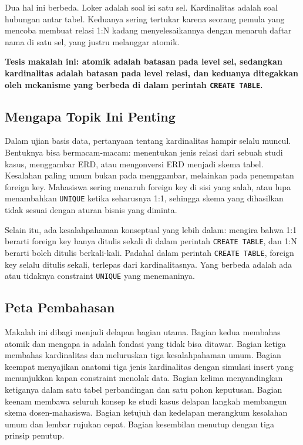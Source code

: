 \documentclass[11pt,a4paper]{article}
\begin{document}
Dua hal ini berbeda. Loker adalah soal isi satu sel. Kardinalitas adalah soal hubungan antar tabel. Keduanya sering tertukar karena seorang pemula yang mencoba membuat relasi 1:N kadang menyelesaikannya dengan menaruh daftar nama di satu sel, yang justru melanggar atomik.

\textbf{Tesis makalah ini: atomik adalah batasan pada level sel, sedangkan kardinalitas adalah batasan pada level relasi, dan keduanya ditegakkan oleh mekanisme yang berbeda di dalam perintah \texttt{CREATE TABLE}.}

\subsection{Mengapa Topik Ini Penting}

Dalam ujian basis data, pertanyaan tentang kardinalitas hampir selalu muncul. Bentuknya bisa bermacam-macam: menentukan jenis relasi dari sebuah studi kasus, menggambar ERD, atau mengonversi ERD menjadi skema tabel. Kesalahan paling umum bukan pada menggambar, melainkan pada penempatan foreign key. Mahasiswa sering menaruh foreign key di sisi yang salah, atau lupa menambahkan \texttt{UNIQUE} ketika seharusnya 1:1, sehingga skema yang dihasilkan tidak sesuai dengan aturan bisnis yang diminta.

Selain itu, ada kesalahpahaman konseptual yang lebih dalam: mengira bahwa 1:1 berarti foreign key hanya ditulis sekali di dalam perintah \texttt{CREATE TABLE}, dan 1:N berarti boleh ditulis berkali-kali. Padahal dalam perintah \texttt{CREATE TABLE}, foreign key selalu ditulis sekali, terlepas dari kardinalitasnya. Yang berbeda adalah ada atau tidaknya constraint \texttt{UNIQUE} yang menemaninya.

\subsection{Peta Pembahasan}

Makalah ini dibagi menjadi delapan bagian utama. Bagian kedua membahas atomik dan mengapa ia adalah fondasi yang tidak bisa ditawar. Bagian ketiga membahas kardinalitas dan meluruskan tiga kesalahpahaman umum. Bagian keempat menyajikan anatomi tiga jenis kardinalitas dengan simulasi insert yang menunjukkan kapan constraint menolak data. Bagian kelima menyandingkan ketiganya dalam satu tabel perbandingan dan satu pohon keputusan. Bagian keenam membawa seluruh konsep ke studi kasus delapan langkah membangun skema dosen-mahasiswa. Bagian ketujuh dan kedelapan merangkum kesalahan umum dan lembar rujukan cepat. Bagian kesembilan menutup dengan tiga prinsip penutup.
\end{document}
